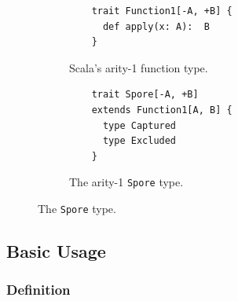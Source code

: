 \documentclass{easychair}
\begin{document}
\begin{figure}[t!]
\begin{subfigure}{.5\textwidth}
  \centering
  \begin{lstlisting}
    trait Function1[-A, +B] {
      def apply(x: A):  B
    }
  \end{lstlisting}
  \caption{Scala's arity-1 function type.}
  \label{fig:function-arity1}
\end{subfigure}%
\begin{subfigure}{.5\textwidth}
  \centering
  \begin{lstlisting}
    trait Spore[-A, +B]
    extends Function1[A, B] {
      type Captured
      type Excluded
    }
  \end{lstlisting}
  \caption{The arity-1 \texttt{Spore} type.}
  \label{fig:spore-arity1}
\end{subfigure}%
\vspace{1mm}
\caption{The \texttt{Spore} type.}
\label{fig:spore-type}
\vspace{-2mm}
\end{figure}






\vspace{2mm}
\subsection{Basic Usage}
\label{sec:basic-usage}
\vspace{1mm}


\subsubsection{Definition}
\end{document}
